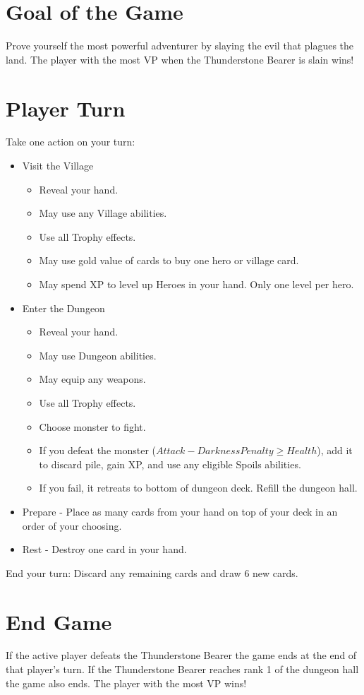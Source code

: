 \documentclass[12pt]{article}
\newenvironment{itemizeCustom}
{\begin{itemize}
  \setlength{\itemsep}{1pt}
  \setlength{\parskip}{0pt}
  \setlength{\parsep}{0pt}}
{\end{itemize}}
\begin{document}
\begin{mdframed}[style = customFrame]
\begin{multicols*}{2}
\section*{Goal of the Game}
Prove yourself the most powerful adventurer by slaying the evil that plagues the land. The player with the most VP when the Thunderstone Bearer is slain wins!

\section*{Player Turn}
Take one action on your turn:
\begin{itemizeCustom}
	\item Visit the Village 
		\begin{itemizeCustom}
			\item Reveal your hand. 
			\item May use any Village abilities. 
			\item Use all Trophy effects. 
			\item May use gold value of cards to buy one hero or village card. 
			\item May spend XP to level up Heroes in your hand. Only one level per hero.
		\end{itemizeCustom}
	\item Enter the Dungeon 
		\begin{itemizeCustom}
			\item Reveal your hand. 
			\item May use Dungeon abilities.
			\item May equip any weapons. 
			\item Use all Trophy effects. 
			\item Choose monster to fight.
			\item If you defeat the monster ($Attack - Darkness Penalty \ge Health$), add it to discard pile, gain XP, and use any eligible Spoils abilities. 
			\item If you fail, it retreats to bottom of dungeon deck. Refill the dungeon hall.
		\end{itemizeCustom}
	\item Prepare - Place as many cards from your hand on top of your deck in an order of your choosing.
	\item Rest - Destroy one card in your hand.

\end{itemizeCustom}
End your turn: Discard any remaining cards and draw 6 new cards.

\section*{End Game}
If the active player defeats the Thunderstone Bearer the game ends at the end of that player's turn. If the Thunderstone Bearer reaches rank 1 of the dungeon hall the game also ends. The player with the most VP wins!

\end{multicols*}
\end{mdframed}
\end{document}
